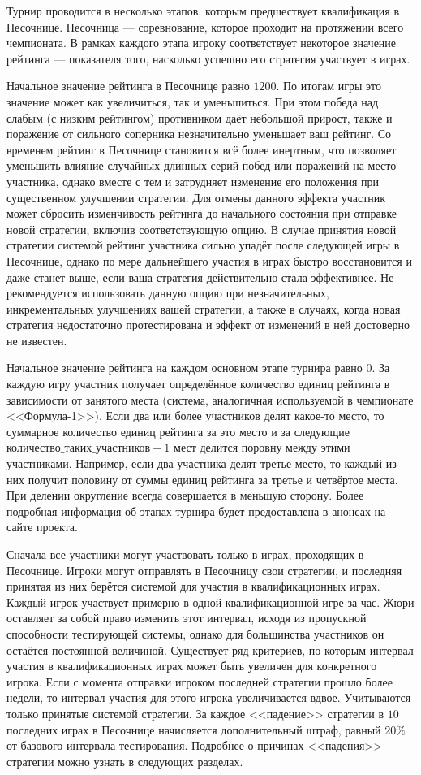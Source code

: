 Турнир проводится в несколько этапов, которым предшествует квалификация в Песочнице. Песочница --- соревнование, которое проходит на
протяжении всего чемпионата. В рамках каждого этапа игроку соответствует некоторое значение рейтинга --- показателя того, насколько успешно
его стратегия участвует в играх.

Начальное значение рейтинга в Песочнице равно $1200$. По итогам игры это значение может как увеличиться, так и уменьшиться. При этом победа
над слабым (с низким рейтингом) противником даёт небольшой прирост, также и поражение от сильного соперника незначительно уменьшает ваш
рейтинг. Со временем рейтинг в Песочнице становится всё более инертным, что позволяет уменьшить влияние случайных длинных серий побед или
поражений на место участника, однако вместе с тем и затрудняет изменение его положения при существенном улучшении стратегии. Для отмены
данного эффекта участник может сбросить изменчивость рейтинга до начального состояния при отправке новой стратегии, включив соответствующую
опцию. В случае принятия новой стратегии системой рейтинг участника сильно упадёт после следующей игры в Песочнице, однако по мере
дальнейшего участия в играх быстро восстановится и даже станет выше, если ваша стратегия действительно стала эффективнее. Не рекомендуется
использовать данную опцию при незначительных, инкрементальных улучшениях вашей стратегии, а также в случаях, когда новая стратегия
недостаточно протестирована и эффект от изменений в ней достоверно не известен.

Начальное значение рейтинга на каждом основном этапе турнира равно $0$. За каждую игру участник получает определённое количество единиц
рейтинга в зависимости от занятого места (система, аналогичная используемой в чемпионате <<Формула-1>>). Если два или более участников делят
какое-то место, то суммарное количество единиц рейтинга за это место и за следующие $\texttt{количество\_таких\_участников}-1$ мест делится
поровну между этими участниками. Например, если два участника делят третье место, то каждый из них получит половину от суммы единиц рейтинга
за третье и четвёртое места. При делении округление всегда совершается в меньшую сторону. Более подробная информация об этапах турнира будет
предоставлена в анонсах на сайте проекта.

Сначала все участники могут участвовать только в играх, проходящих в Песочнице. Игроки могут отправлять в Песочницу свои стратегии, и
последняя принятая из них берётся системой для участия в квалификационных играх. Каждый игрок участвует примерно в одной квалификационной
игре за час. Жюри оставляет за собой право изменить этот интервал, исходя из пропускной способности тестирующей системы, однако для
большинства участников он остаётся постоянной величиной. Существует ряд критериев, по которым интервал участия в квалификационных играх
может быть увеличен для конкретного игрока. Если с момента отправки игроком последней стратегии прошло более недели, то интервал участия
для этого игрока увеличивается вдвое. Учитываются только принятые системой стратегии. За каждое <<падение>> стратегии в $10$ последних
играх в Песочнице начисляется дополнительный штраф, равный $20\%$ от базового интервала тестирования. Подробнее о причинах <<падения>>
стратегии можно узнать в следующих разделах.


